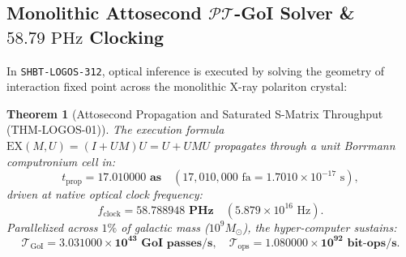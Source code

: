 \documentclass[11pt,onecolumn]{article}
\newtheorem{theorem}{Theorem}
\begin{document}
\subsection{Monolithic Attosecond \texorpdfstring{$\mathcal{PT}$-GoI}{PT-GoI} Solver \& \texorpdfstring{$58.79\text{ PHz}$}{58.79 PHz} Clocking}
\label{sec:logos_pt_goi_solver}

In \texttt{SHBT-LOGOS-312}, optical inference is executed by solving the geometry of interaction fixed point across the monolithic X-ray polariton crystal:

\begin{theorem}[Attosecond Propagation and Saturated S-Matrix Throughput (THM-LOGOS-01)]
\label{thm:logos_goi_speed}
The execution formula $\text{EX}(M, U) = (I + UM)U = U + UMU$ propagates through a unit Borrmann computronium cell in:
\begin{equation}
t_{\text{prop}} = \mathbf{17.010000\text{ as}} \quad (17{,}010{,}000\text{ fa} = 1.7010 \times 10^{-17}\text{ s}),
\label{eq:t_prop_attoseconds}
\end{equation}
driven at native optical clock frequency:
\begin{equation}
f_{\text{clock}} = \mathbf{58.788948\text{ PHz}} \quad (5.879 \times 10^{16}\text{ Hz}).
\label{eq:f_clock_petahertz}
\end{equation}
Parallelized across $1\%$ of galactic mass ($10^9 M_\odot$), the hyper-computer sustains:
\begin{equation}
\mathcal{T}_{\text{GoI}} = \mathbf{3.031000 \times 10^{43}\text{ GoI passes/s}}, \quad \mathcal{T}_{\text{ops}} = \mathbf{1.080000 \times 10^{92}\text{ bit-ops/s}}.
\label{eq:ops_per_second}
\end{equation}
\end{theorem}
\end{document}
